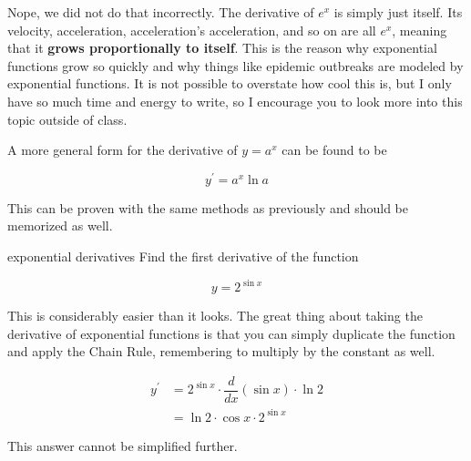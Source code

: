 Nope, we did not do that incorrectly. The derivative of \( e^x \) is simply just itself. Its velocity, acceleration, acceleration's acceleration, and so on are all \( e^x \), meaning that it \textbf{grows proportionally to itself}. This is the reason why exponential functions grow so quickly and why things like epidemic outbreaks are modeled by exponential functions. It is not possible to overstate how cool this is, but I only have so much time and energy to write, so I encourage you to look more into this topic outside of class.

A more general form for the derivative of \( y = a^x \) can be found to be

\[ y^\prime = a^x \ln{a} \]

This can be proven with the same methods as previously and should be memorized as well.

\begin{example}{exponential derivatives}
    Find the first derivative of the function
    
    \[ y = 2^{\sin{x}} \]
    
    \vspace{0.3cm}
    
    This is considerably easier than it looks. The great thing about taking the derivative of exponential functions is that you can simply duplicate the function and apply the Chain Rule, remembering to multiply by the constant as well.
    
    \begin{align}
        y^\prime &= 2^{\sin{x}} \cdot \dfrac{d}{dx} \left( \sin{x} \right) \cdot \ln{2} \\
        &= \ln{2} \cdot \cos{x} \cdot 2^{\sin{x}}
    \end{align}
    
    This answer cannot be simplified further.
\end{example}
